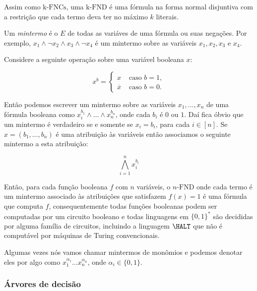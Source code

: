 Assim como $\text{k-FNCs}$, uma $\text{k-FND}$ é uma fórmula na forma normal disjuntiva com a restrição que cada termo deva ter no máximo $k$ literais.

\begin{defi}

Um \emph{mintermo} é o $E$ de todas as variáves de uma fórmula ou suas negações. Por exemplo, $x_{1} \land \lnot x_{2} \land x_{3} \land \lnot x_{4}$ é um mintermo sobre as variáveis $x_{1}, x_{2}, x_{3} \text{ e } x_{4}$.

\end{defi}

Considere a seguinte operação sobre uma variável booleana $x$:

\begin{equation*}
    x^{b} =
    \begin{cases}
        x & \text{ caso } b = 1, \\
        \overline{x} & \text{ caso } b = 0.
    \end{cases}
\end{equation*}

Então podemos escrever um mintermo sobre as variáveis $x_{1}, \dots, x_{n}$ de uma fórmula booleana como $x_{i}^{b_{1}} \land \dots \land x_{n}^{b_{n}}$, onde cada $b_{i}$ é $0$ ou $1$. Daí fica óbvio que um mintermo é verdadeiro se e somente se $x_{i} = b_{i}$, para cada $i \in [n]$. Se $x = (b_{1}, \dots, b_{n})$ é uma atribuição às variáveis então associamos o seguinte mintermo a esta atribuição:

\begin{equation*}
\bigwedge_{i = 1}^{n} x_{i}^{b_{i}}
\end{equation*}

Então, para cada função booleana $f$ com $n$ variáveis, o $n\text{-FND}$ onde cada termo é um mintermo associado às atribuições que satisfazem $f(x) = 1$ é uma fórmula que computa $f$, consequentemente todas funções booleanas podem ser computadas por um circuito booleano e todas linguagens em $\{0, 1\}^{*}$ são decididas por alguma família de circuitos, incluindo a linguagem $\HALT$ que não é computável por máquinas de Turing convencionais.

Algumas vezes nós vamos chamar mintermos de monômios e podemos denotar eles por algo como $x_{1}^{\alpha_{1}}\dots x_{n}^{\alpha_{n}}$, onde $\alpha_{i} \in \{0, 1\}$.

\subsubsection{Árvores de decisão}

